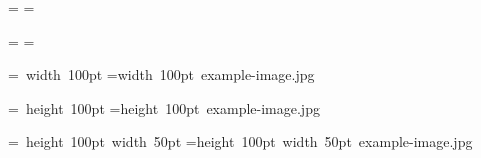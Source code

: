 

\ifhint
{}=\hbox{}
\else
{}=\hbox{\pdfrefximage\pdflastximage} 
\fi
\showthe{}
\showthe{}

\ifhint
{}=\hbox{}
\else
{}=\hbox{\pdfrefximage\pdflastximage}
\fi
\showthe{}
\showthe{}

\ifhint
{}=\hbox{ width 100pt}
\else
{}=\hbox{\pdfximage width 100pt {example-image.jpg}\pdfrefximage\pdflastximage}
\fi
\showthe{}
\showthe{}

\ifhint
{}=\hbox{ height 100pt}
\else
{}=\hbox{\pdfximage height 100pt {example-image.jpg}\pdfrefximage\pdflastximage}
\fi
\showthe{}
\showthe{}

\ifhint
{}=\hbox{ height 100pt width 50pt}
\else
{}=\hbox{\pdfximage height 100pt width 50pt {example-image.jpg}\pdfrefximage\pdflastximage}
\fi
\showthe{}
\showthe{}





\bye


